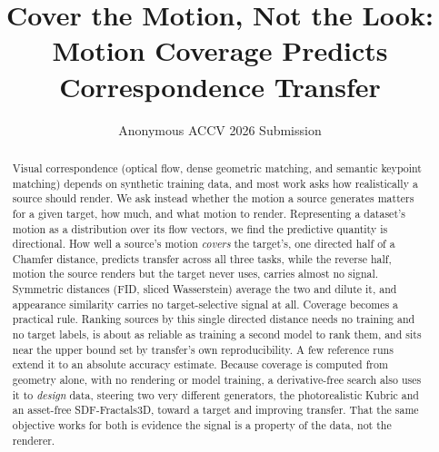 \documentclass[runningheads]{llncs}
\begin{document}
\title{Cover the Motion, Not the Look: Motion Coverage Predicts
Correspondence Transfer}

\author{Anonymous ACCV 2026 Submission}

\maketitle

\begin{abstract}
Visual correspondence (optical flow, dense geometric matching, and semantic keypoint
matching) depends on synthetic training data, and most work asks how realistically a
source should render. We ask instead whether the motion a source generates matters
for a given target, how much, and what motion to render. Representing a dataset's
motion as a distribution over its flow vectors, we find the predictive quantity is
directional. How well a source's motion \emph{covers} the target's, one directed half
of a Chamfer distance, predicts transfer across all three tasks, while the reverse
half, motion the source renders but the target never uses, carries almost no signal.
Symmetric distances (FID, sliced Wasserstein) average the two and dilute it, and
appearance similarity carries no target-selective signal at all. Coverage becomes a
practical rule. Ranking sources by this single directed distance needs no training
and no target labels, is about as reliable as training a second model to rank them,
and sits near the upper bound set by transfer's own reproducibility. A few reference runs
extend it to an absolute accuracy estimate. Because coverage is computed from
geometry alone, with no rendering or model training, a derivative-free search also
uses it to \emph{design} data, steering two very different generators, the
photorealistic Kubric and an asset-free SDF-Fractals3D, toward a target and improving
transfer. That the same objective works for both is evidence the signal is a property
of the data, not the renderer.

\end{abstract}












\end{document}
